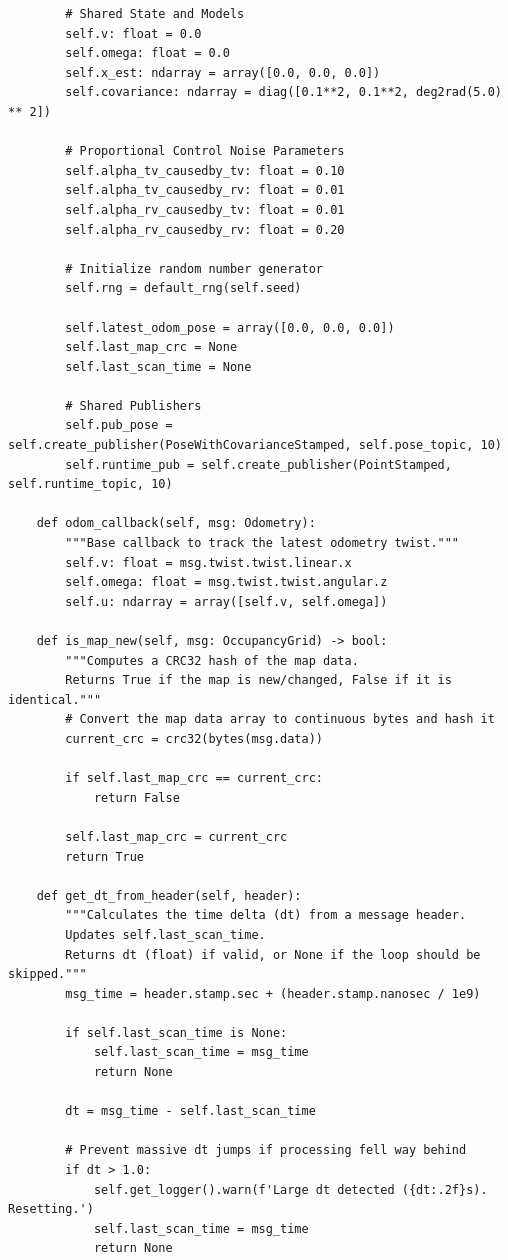 \begin{verbatim}
        # Shared State and Models
        self.v: float = 0.0
        self.omega: float = 0.0
        self.x_est: ndarray = array([0.0, 0.0, 0.0])
        self.covariance: ndarray = diag([0.1**2, 0.1**2, deg2rad(5.0) ** 2])

        # Proportional Control Noise Parameters
        self.alpha_tv_causedby_tv: float = 0.10
        self.alpha_tv_causedby_rv: float = 0.01
        self.alpha_rv_causedby_tv: float = 0.01
        self.alpha_rv_causedby_rv: float = 0.20

        # Initialize random number generator
        self.rng = default_rng(self.seed)

        self.latest_odom_pose = array([0.0, 0.0, 0.0])
        self.last_map_crc = None
        self.last_scan_time = None

        # Shared Publishers
        self.pub_pose = self.create_publisher(PoseWithCovarianceStamped, self.pose_topic, 10)
        self.runtime_pub = self.create_publisher(PointStamped, self.runtime_topic, 10)

    def odom_callback(self, msg: Odometry):
        """Base callback to track the latest odometry twist."""
        self.v: float = msg.twist.twist.linear.x
        self.omega: float = msg.twist.twist.angular.z
        self.u: ndarray = array([self.v, self.omega])

    def is_map_new(self, msg: OccupancyGrid) -> bool:
        """Computes a CRC32 hash of the map data.
        Returns True if the map is new/changed, False if it is identical."""
        # Convert the map data array to continuous bytes and hash it
        current_crc = crc32(bytes(msg.data))

        if self.last_map_crc == current_crc:
            return False

        self.last_map_crc = current_crc
        return True

    def get_dt_from_header(self, header):
        """Calculates the time delta (dt) from a message header.
        Updates self.last_scan_time.
        Returns dt (float) if valid, or None if the loop should be skipped."""
        msg_time = header.stamp.sec + (header.stamp.nanosec / 1e9)

        if self.last_scan_time is None:
            self.last_scan_time = msg_time
            return None

        dt = msg_time - self.last_scan_time

        # Prevent massive dt jumps if processing fell way behind
        if dt > 1.0:
            self.get_logger().warn(f'Large dt detected ({dt:.2f}s). Resetting.')
            self.last_scan_time = msg_time
            return None


\end{verbatim}
